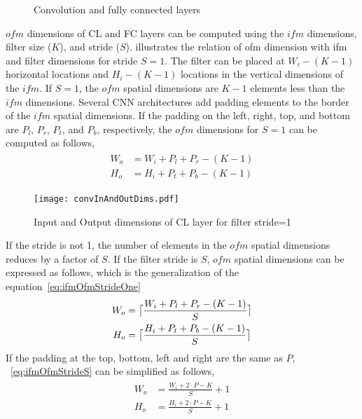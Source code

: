 \begin{figure}[!htb]
	\centering
	\captionsetup{font=sf}	
	\hfil	
	\hfil	
	\caption{Convolution and fully connected layers}
	\label{fig:CNNAcceleratorAndCLOps}
\end{figure}

$ofm$ dimensions of CL and FC layers can be computed using the $ifm$ dimensions, filter size ($K$), and stride ($S$).  illustrates the relation of ofm dimension with ifm and filter dimensions for stride $S{=}1$. The filter can be placed at $W_i{-}(K{-}1)$ horizontal locations and $H_i{-}(K{-}1)$ locations in the vertical dimensions of the $ifm$. If $S{=}1$, the $ofm$ spatial dimensions are $K{-}1$ elements less than the $ifm$ dimensions. Several CNN architectures add padding elements to the border of the $ifm$ spatial dimensions. If the padding on the left, right, top, and bottom are $P_l$, $P_r$, $P_t$, and $P_b$, respectively, the $ofm$ dimensions for $S{=}1$ can be computed as follows,
\begin{align}\label{eq:ifmOfmStrideOne}
	\begin{split}
W_o&=W_i+P_l+P_r-(K-1)\\
H_o&=H_i+P_t+P_b-(K-1)
\end{split}
\end{align}
\begin{figure}[!htb]
	\centering
	\captionsetup{font=sf}	
	{\texttt{[image: convInAndOutDims.pdf]}
		\label{fig:CLInOutRelHz}}
	\caption{Input and Output dimensions of CL layer for filter stride=1  }
	\label{fig:CLInOutDimRel}
\end{figure}
If the stride is not 1, the number of elements in the $ofm$ spatial dimensions reduces by a factor of $S$. If the filter stride is $S$, $ofm$ spatial dimensions can be expressed as follows, which is the generalization of the equation~\eqref{eq:ifmOfmStrideOne}
\begin{align}\label{eq:ifmOfmStrideS}
	\begin{split}
		W_o&=\ceil[\big]{\frac{W_i+P_l+P_r-(K-1)}{S}}\\
		H_o&=\ceil[\big]{\frac{H_i+P_t+P_b-(K-1)}{S}}
	\end{split}
\end{align}
If the padding at the top, bottom, left and right are the same as $P$, ~\eqref{eq:ifmOfmStrideS} can be simplified as follows,
\begin{align}\label{eq:ifmOfmStrideS_P}
	\begin{split}
		W_o&={\frac{W_i+2\cdot P-K}{S}}{+}1\\
		H_o&={\frac{H_i+2\cdot P-K}{S}{+}1}
	\end{split}
\end{align}

